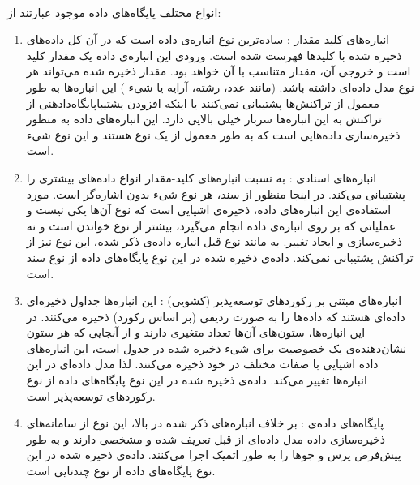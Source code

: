 \paragraph*{}
انواع مختلف پایگاه‌های داده موجود عبارتند از:
\begin{enumerate}
\item
انباره‌های کلید-مقدار
:
ساده‌ترین نوع انباره‌ی داده است که در آن کل داده‌های ذخیره شده با کلیدها فهرست
شده است. ورودی این انباره‌ی داده یک مقدار کلید است و خروجی آن، مقدار متناسب با آن خواهد بود.
\cite{cattell-2011}
مقدار ذخیره شده می‌تواند هر نوع مدل داده‌ای داشته باشد. (مانند عدد، رشته، آرایه یا شیء
)
این انباره‌ها به طور معمول از تراکنش‌ها پشتیبانی نمی‌کنند یا اینکه افزودن پشتیباپایگاه‌دادهنی از تراکنش
به این انباره‌ها سربار خیلی بالایی دارد.
\cite{stonebraker-2011}
این انباره‌های داده به منظور ذخیره‌سازی داده‌هایی است که به طور معمول از یک نوع هستند و این نوع شیء است.
\cite{cattell-2011}

\item
انباره‌های اسنادی
:
به نسبت انباره‌های کلید-مقدار انواع داده‌های بیشتری را پشتیبانی می‌کند. در اینجا منظور از سند، هر نوع شیء بدون اشاره‌گر
است. مورد استفاده‌ی این انباره‌های داده، ذخیره‌ی اشیایی است که نوع آن‌ها یکی نیست و عملیاتی که بر روی انباره‌ی داده انجام می‌گیرد، بیشتر از نوع خواندن است و نه ذخیره‌سازی و ایجاد تغییر.
\cite{cattell-2011}
به مانند نوع قبل انباره داده‌ی ذکر شده، این نوع نیز از تراکنش پشتیبانی نمی‌کند.
\cite{stonebraker-2011}
 داده‌ی ذخیره شده در این نوع پایگاه‌های داده از نوع سند
است.

\item
انباره‌های مبتنی بر رکوردهای توسعه‌پذیر (کشویی)
:
این انباره‌ها جداول ذخیره‌ای داده‌ای هستند که داده‌ها را به صورت ردیفی (بر اساس رکورد) ذخیره می‌کنند. در این انباره‌ها، ستون‌های آن‌ها تعداد متغیری دارند و از آنجایی که هر ستون نشان‌دهنده‌ی یک خصوصیت برای شیء ذخیره شده در جدول است، این انباره‌های داده اشیایی با صفات
مختلف در خود ذخیره می‌کنند. لذا مدل داده‌ای در این انباره‌ها تغییر می‌کند.
\cite{stonebraker-2011}
 داده‌ی ذخیره شده در این نوع پایگاه‌های داده از نوع رکوردهای توسعه‌پذیر است.

\item
پایگاه‌های داده‌ی
:
بر خلاف انباره‌های ذکر شده در بالا، این نوع از سامانه‌های ذخیره‌سازی داده مدل داده‌ای از قبل تعریف شده و مشخصی دارند و به طور پیش‌فرض پرس و جوها را به طور اتمیک
اجرا می‌کنند. داده‌ی ذخیره شده در این نوع پایگاه‌های داده از نوع چندتایی
است.
\cite{cattell-2011}
\end{enumerate}

